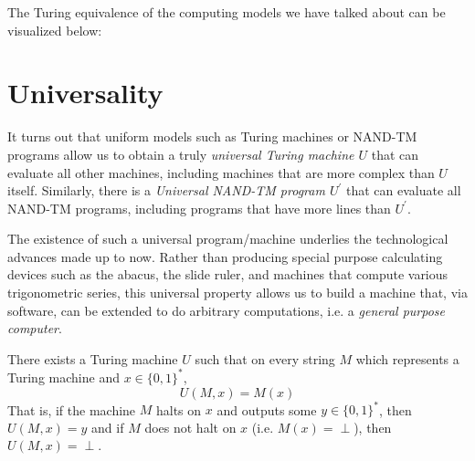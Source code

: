   The Turing equivalence of the computing models we have talked about can be visualized below: 
  \begin{center}
  \end{center}

\section{Universality}

  It turns out that uniform models such as Turing machines or NAND-TM programs allow us to obtain a truly \textit{universal Turing machine $U$} that can evaluate all other machines, including machines that are more complex than $U$ itself. Similarly, there is a \textit{Universal NAND-TM program $U^\prime$} that can evaluate all NAND-TM programs, including programs that have more lines than $U^\prime$. 

  The existence of such a universal program/machine underlies the technological advances made up to now. Rather than producing special purpose calculating devices such as the abacus, the slide ruler, and machines that compute various trigonometric series, this universal property allows us to build a machine that, via software, can be extended to do arbitrary computations, i.e. a \textit{general purpose computer}. 

  \begin{theorem}
  There exists a Turing machine $U$ such that on every string $M$ which represents a Turing machine and $x \in \{0,1\}^*$, 
  \[U(M, x) = M(x)\]
  That is, if the machine $M$ halts on $x$ and outputs some $y \in \{0,1\}^*$, then $U(M, x) = y$ and if $M$ does not halt on $x$ (i.e. $M(x) = \perp$), then $U(M, x) = \perp$. 
  \end{theorem}

